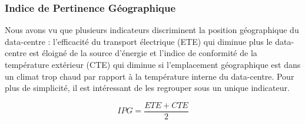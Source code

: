 \subsubsection{Indice de Pertinence Géographique}
Nous avons vu que plusieurs indicateurs discriminent la position géographique du data-centre : l'efficacité du transport électrique (ETE) qui diminue plus le data-centre est éloigné de la source d'énergie et l'indice de conformité de la température extérieur (CTE) qui diminue si l'emplacement géographique est dans un climat trop chaud par rapport à la température interne du data-centre. Pour plus de simplicité, il est intéressant de les regrouper sous un unique indicateur.

\[IPG=\frac{ETE + CTE}{2}\]